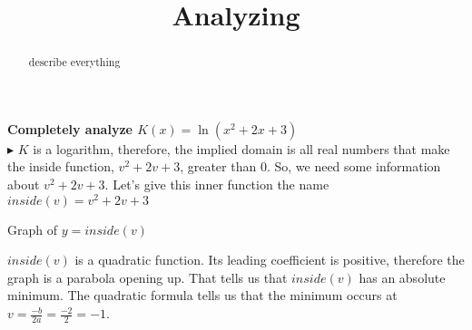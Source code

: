 \documentclass{ximera}
\title{Analyzing}
\begin{document}
\begin{abstract}
describe everything
\end{abstract}
\maketitle







\textbf{Completely analyze $K(x) = \ln(x^2+2x+3)$} \\

$\blacktriangleright$  $K$ is a logarithm, therefore, the implied domain is all real numbers that make the inside function, $v^2+2v+3$, greater than $0$.  So, we need some information about $v^2+2v+3$.   Let's give this inner function the name $inside(v) = v^2+2v+3$





Graph of $y = inside(v)$




\begin{image}
\end{image}




$inside(v)$ is a quadratic function.  Its leading coefficient is positive, therefore the graph is a parabola opening up.  That tells us that $inside(v)$ has an absolute minimum.  The quadratic formula tells us that the minimum occurs at $v=\frac{-b}{2a} = \frac{-2}{2} = -1$.
\end{document}

